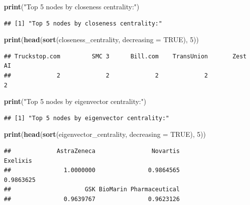 \documentclass[
]{article}
\newenvironment{Shaded}{\begin{snugshade}}{\end{snugshade}}
\newcommand{\AttributeTok}[1]{\textcolor[rgb]{0.13,0.29,0.53}{#1}}
\newcommand{\ConstantTok}[1]{\textcolor[rgb]{0.56,0.35,0.01}{#1}}
\newcommand{\DecValTok}[1]{\textcolor[rgb]{0.00,0.00,0.81}{#1}}
\newcommand{\FunctionTok}[1]{\textcolor[rgb]{0.13,0.29,0.53}{\textbf{#1}}}
\newcommand{\NormalTok}[1]{#1}
\newcommand{\StringTok}[1]{\textcolor[rgb]{0.31,0.60,0.02}{#1}}
\begin{document}
\begin{Shaded}
\begin{Highlighting}[]
\FunctionTok{print}\NormalTok{(}\StringTok{"Top 5 nodes by closeness centrality:"}\NormalTok{)}
\end{Highlighting}
\end{Shaded}

\begin{verbatim}
## [1] "Top 5 nodes by closeness centrality:"
\end{verbatim}

\begin{Shaded}
\begin{Highlighting}[]
\FunctionTok{print}\NormalTok{(}\FunctionTok{head}\NormalTok{(}\FunctionTok{sort}\NormalTok{(closeness\_centrality, }\AttributeTok{decreasing =} \ConstantTok{TRUE}\NormalTok{), }\DecValTok{5}\NormalTok{))}
\end{Highlighting}
\end{Shaded}

\begin{verbatim}
## Truckstop.com         SMC 3      Bill.com    TransUnion       Zest AI 
##             2             2             2             2             2
\end{verbatim}

\begin{Shaded}
\begin{Highlighting}[]
\FunctionTok{print}\NormalTok{(}\StringTok{"Top 5 nodes by eigenvector centrality:"}\NormalTok{)}
\end{Highlighting}
\end{Shaded}

\begin{verbatim}
## [1] "Top 5 nodes by eigenvector centrality:"
\end{verbatim}

\begin{Shaded}
\begin{Highlighting}[]
\FunctionTok{print}\NormalTok{(}\FunctionTok{head}\NormalTok{(}\FunctionTok{sort}\NormalTok{(eigenvector\_centrality, }\AttributeTok{decreasing =} \ConstantTok{TRUE}\NormalTok{), }\DecValTok{5}\NormalTok{))}
\end{Highlighting}
\end{Shaded}

\begin{verbatim}
##             AstraZeneca                Novartis                Exelixis 
##               1.0000000               0.9864565               0.9863625 
##                     GSK BioMarin Pharmaceutical 
##               0.9639767               0.9623126
\end{verbatim}
\end{document}
